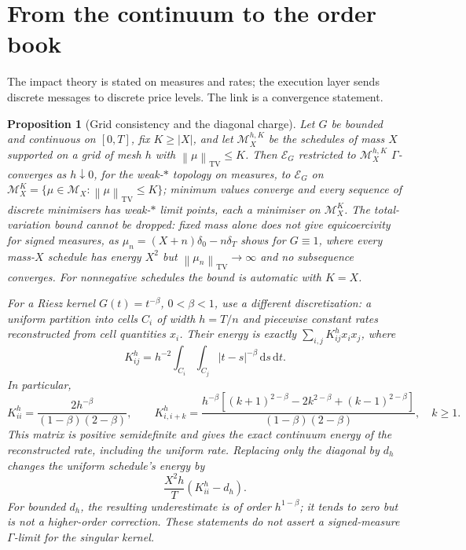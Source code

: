 \documentclass[11pt]{article}
\newcommand{\norm}[1]{\left\lVert #1\right\rVert}
\numberwithin{equation}{section}
\newtheorem{proposition}[theorem]{Proposition}
\theoremstyle{definition}
\theoremstyle{remark}
\theoremstyle{definition}
\newcommand{\TV}{\operatorname{TV}}
\newcommand{\dd}{\,\mathrm d}
\begin{document}
\section{From the continuum to the order book}\label{sec:discretisation}

The impact theory is stated on measures and rates; the execution layer sends
discrete messages to discrete price levels. The link is a convergence statement.

\begin{proposition}[Grid consistency and the diagonal charge]\label{prop:gamma}
Let $G$ be bounded and continuous on $[0,T]$, fix $K\ge|X|$, and let
$\mathcal M_X^{h,K}$ be the schedules of mass $X$ supported on a grid of mesh
$h$ with $\norm\mu_{\TV}\le K$. Then $\mathcal E_G$ restricted to
$\mathcal M_X^{h,K}$ $\Gamma$-converges as $h\downarrow0$, for the weak-$*$
topology on measures, to $\mathcal E_G$ on
$\mathcal M_X^K=\{\mu\in\mathcal M_X:\norm\mu_{\TV}\le K\}$; minimum values
converge and every sequence of discrete minimisers has weak-$*$ limit points,
each a minimiser on $\mathcal M_X^K$. The total-variation bound cannot be
dropped: fixed mass alone does not give equicoercivity for signed measures, as
$\mu_n=(X+n)\delta_0-n\delta_T$ shows for $G\equiv1$, where every mass-$X$
schedule has energy $X^2$ but $\norm{\mu_n}_{\TV}\to\infty$ and no subsequence
converges. For nonnegative schedules the bound is automatic with $K=X$.

For a Riesz kernel $G(t)=t^{-\beta}$, $0<\beta<1$, use a different
discretization: a uniform partition into cells $C_i$ of width $h=T/n$ and
piecewise constant rates reconstructed from cell quantities $x_i$. Their
energy is exactly $\sum_{i,j}K^h_{ij}x_ix_j$, where
\begin{equation}\label{eq:rieszcells}
 K^h_{ij}=h^{-2}\int_{C_i}\int_{C_j}|t-s|^{-\beta}\dd s\dd t.
\end{equation}
In particular,
\[
 K^h_{ii}=\frac{2h^{-\beta}}{(1-\beta)(2-\beta)},\qquad
 K^h_{i,i+k}=\frac{h^{-\beta}
 [(k+1)^{2-\beta}-2k^{2-\beta}+(k-1)^{2-\beta}]}
 {(1-\beta)(2-\beta)},\quad k\ge1.
\]
This matrix is positive semidefinite and gives the exact continuum energy of
the reconstructed rate, including the uniform rate. Replacing only the
diagonal by $d_h$ changes the uniform schedule's energy by
\begin{equation}\label{eq:diagonalbias}
 \frac{X^2h}{T}(K^h_{ii}-d_h).
\end{equation}
For bounded $d_h$, the resulting underestimate is of order $h^{1-\beta}$;
it tends to zero but is not a higher-order correction. These statements do
not assert a signed-measure $\Gamma$-limit for the singular kernel.
\end{proposition}
\end{document}
